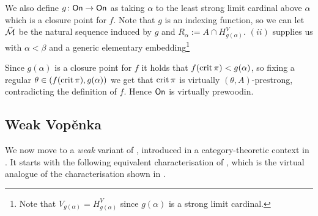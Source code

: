 \documentclass[../../main]{subfiles}
\begin{document}
{  \qquad We also define $g\colon\textsf{On}\to\textsf{On}$ as taking $\alpha$ to the least strong limit cardinal above $\alpha$ which is a closure point for $f$. Note that $g$ is an indexing function, so we can let $\vec{\operatorname{\mathcal M}}$ be the natural sequence induced by $g$ and $R_\alpha := A\cap H_{g(\alpha)}^V$. $(ii)$ supplies us with $\alpha<\beta$ and a generic elementary embedding\footnote{Note that $V_{g(\alpha)}=H_{g(\alpha)}^V$ since $g(\alpha)$ is a strong limit cardinal.}

  Since $g(\alpha)$ is a closure point for $f$ it holds that $f(\operatorname{crit}\pi)<g(\alpha)$, so fixing a regular $\theta\in(f(\operatorname{crit}\pi), g(\alpha))$ we get that $\operatorname{crit}\pi$ is virtually $(\theta, A)$-prestrong, contradicting the definition of $f$. Hence $\textsf{On}$ is virtually prewoodin.
}


\subsection{Weak Vop\v enka}

We now move to a \textit{weak} variant of \gvp, introduced in a category-theoretic context in \cite{AdamekRosicky}. It starts with the following equivalent characterisation of \gvp, which is the virtual analogue of the characterisation shown in \cite{AdamekRosicky}.
\end{document}
